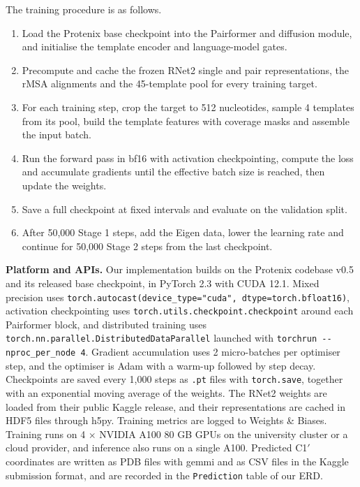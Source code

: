 \documentclass{FastFyp}
\begin{document}
The training procedure is as follows.

\begin{enumerate}
\item Load the Protenix base checkpoint into the Pairformer and diffusion module, and initialise the template encoder and language-model gates.
\item Precompute and cache the frozen RNet2 single and pair representations, the rMSA alignments and the 45-template pool for every training target.
\item For each training step, crop the target to 512 nucleotides, sample 4 templates from its pool, build the template features with coverage masks and assemble the input batch.
\item Run the forward pass in bf16 with activation checkpointing, compute the loss and accumulate gradients until the effective batch size is reached, then update the weights.
\item Save a full checkpoint at fixed intervals and evaluate on the validation split.
\item After 50,000 Stage 1 steps, add the Eigen data, lower the learning rate and continue for 50,000 Stage 2 steps from the last checkpoint.
\end{enumerate}

\textbf{Platform and APIs.} Our implementation builds on the Protenix codebase v0.5 and its released base checkpoint, in PyTorch 2.3 with CUDA 12.1. Mixed precision uses \texttt{torch.autocast(device\_type="cuda", dtype=torch.bfloat16)}, activation checkpointing uses \texttt{torch.utils.checkpoint.checkpoint} around each Pairformer block, and distributed training uses \texttt{torch.nn.parallel.DistributedDataParallel} launched with \texttt{torchrun -{}-nproc\_per\_node 4}. Gradient accumulation uses 2 micro-batches per optimiser step, and the optimiser is Adam with a warm-up followed by step decay. Checkpoints are saved every 1,000 steps as \texttt{.pt} files with \texttt{torch.save}, together with an exponential moving average of the weights. The RNet2 weights are loaded from their public Kaggle release, and their representations are cached in HDF5 files through h5py. Training metrics are logged to Weights \& Biases. Training runs on 4 $\times$ NVIDIA A100 80 GB GPUs on the university cluster or a cloud provider, and inference also runs on a single A100. Predicted C1$'$ coordinates are written as PDB files with gemmi and as CSV files in the Kaggle submission format, and are recorded in the \texttt{Prediction} table of our ERD.
\end{document}
